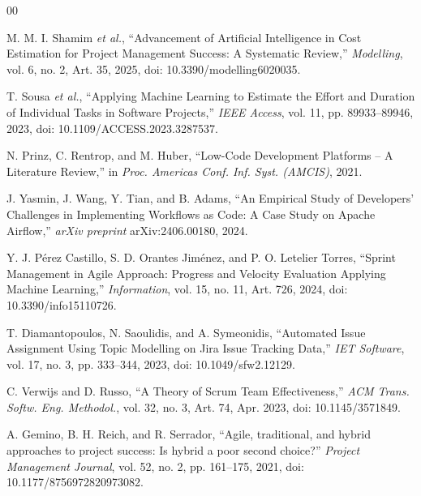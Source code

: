 \documentclass[conference]{IEEEtran}
\begin{document}

\begin{thebibliography}{00}


M. M. I. Shamim \textit{et al.},
``Advancement of Artificial Intelligence in Cost Estimation for Project Management Success: A Systematic Review,''
\textit{Modelling}, vol. 6, no. 2, Art. 35, 2025,
doi: 10.3390/modelling6020035.

T. Sousa \textit{et al.}, ``Applying Machine Learning to Estimate the Effort and Duration of Individual Tasks in Software Projects,''
\textit{IEEE Access}, vol. 11, pp. 89933--89946, 2023,
doi: 10.1109/ACCESS.2023.3287537.

N. Prinz, C. Rentrop, and M. Huber, ``Low-Code Development Platforms -- A Literature Review,''
in \textit{Proc. Americas Conf. Inf. Syst. (AMCIS)}, 2021.

J. Yasmin, J. Wang, Y. Tian, and B. Adams, ``An Empirical Study of Developers' Challenges in Implementing Workflows as Code: A Case Study on Apache Airflow,''
\textit{arXiv preprint} arXiv:2406.00180, 2024.

Y. J. P\'erez Castillo, S. D. Orantes Jim\'enez, and P. O. Letelier Torres,
``Sprint Management in Agile Approach: Progress and Velocity Evaluation Applying Machine Learning,''
\textit{Information}, vol. 15, no. 11, Art. 726, 2024,
doi: 10.3390/info15110726.

T. Diamantopoulos, N. Saoulidis, and A. Symeonidis,
``Automated Issue Assignment Using Topic Modelling on Jira Issue Tracking Data,''
\textit{IET Software}, vol. 17, no. 3, pp. 333--344, 2023,
doi: 10.1049/sfw2.12129.


C. Verwijs and D. Russo, ``A Theory of Scrum Team Effectiveness,''
\textit{ACM Trans. Softw. Eng. Methodol.}, vol. 32, no. 3, Art. 74, Apr. 2023,
doi: 10.1145/3571849.

A. Gemino, B. H. Reich, and R. Serrador, ``Agile, traditional, and hybrid approaches to project success: Is hybrid a poor second choice?''
\textit{Project Management Journal}, vol. 52, no. 2, pp. 161--175, 2021,
doi: 10.1177/8756972820973082.


\end{thebibliography}
\end{document}
